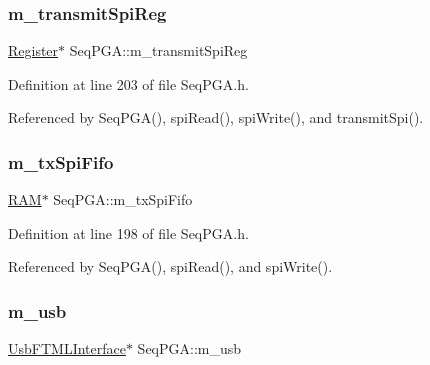 \mbox{\label{classSeqPGA_a4e0ffb37b1cd947d389354ac25723ab8}} 
\subsubsection{\texorpdfstring{m\+\_\+transmit\+Spi\+Reg}{m\_transmitSpiReg}}
{\footnotesize\ttfamily \hyperlink{classRegister}{Register}$\ast$ Seq\+P\+G\+A\+::m\+\_\+transmit\+Spi\+Reg\hspace{0.3cm}{\ttfamily [private]}}



Definition at line 203 of file Seq\+P\+G\+A.\+h.



Referenced by Seq\+P\+G\+A(), spi\+Read(), spi\+Write(), and transmit\+Spi().

\mbox{\label{classSeqPGA_a6fbdd81928bb5d0fcd671ae2facaef11}} 
\subsubsection{\texorpdfstring{m\+\_\+tx\+Spi\+Fifo}{m\_txSpiFifo}}
{\footnotesize\ttfamily \hyperlink{classRAM}{R\+AM}$\ast$ Seq\+P\+G\+A\+::m\+\_\+tx\+Spi\+Fifo\hspace{0.3cm}{\ttfamily [private]}}



Definition at line 198 of file Seq\+P\+G\+A.\+h.



Referenced by Seq\+P\+G\+A(), spi\+Read(), and spi\+Write().

\mbox{\label{classSeqPGA_a3df81bbe0e75a1287aa6fe9d33ea27f5}} 
\subsubsection{\texorpdfstring{m\+\_\+usb}{m\_usb}}
{\footnotesize\ttfamily \hyperlink{classUsbFTMLInterface}{Usb\+F\+T\+M\+L\+Interface}$\ast$ Seq\+P\+G\+A\+::m\+\_\+usb\hspace{0.3cm}{\ttfamily [private]}}



